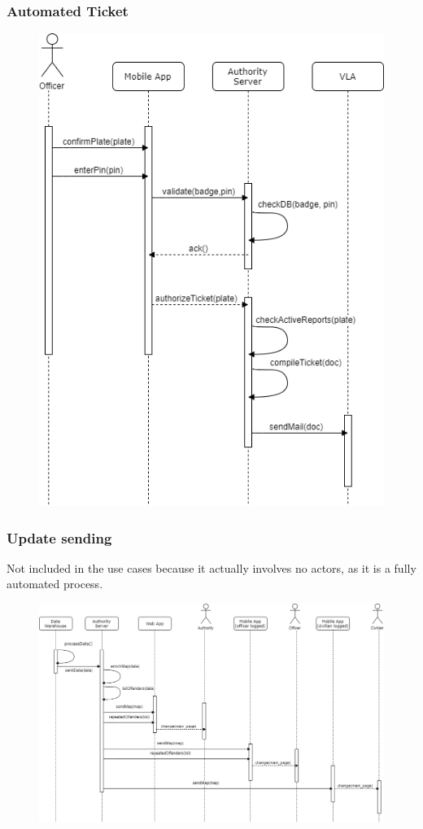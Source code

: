 \documentclass[12pt,a4paper]{article}
\begin{document}
		\subsubsection{Automated Ticket}
			\begin{figure}[H]
				\centering
				\includegraphics[width=.9\textwidth,height=.9\textheight,keepaspectratio]{Images/automated_ticket}
				\label{fig:automated_request_sequence}
			\end{figure}
\newpage
		\subsubsection{Update sending}
Not included in the use cases because it actually involves no actors, as it is a fully automated process.
			\begin{figure}[H]
				\centering
				\includegraphics[width=.9\textwidth,height=.9\textheight,keepaspectratio]{Images/update_sending}
				\label{fig:sampling_request_sequence}
			\end{figure}
\end{document}
